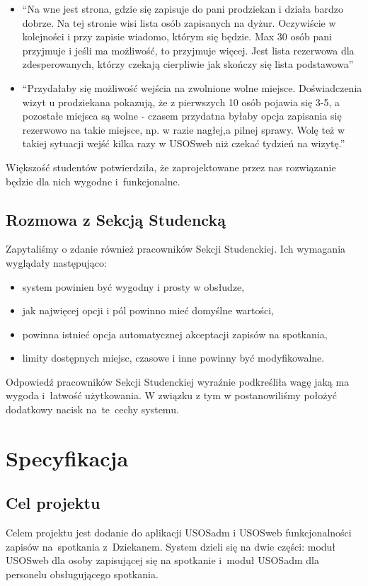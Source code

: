 \documentclass[licencjacka]{pracamgr}
\begin{document}
\begin{itemize}
\begin{itemize}
\item \enquote{Na wne jest strona, gdzie się zapisuje do pani prodziekan i działa bardzo dobrze. Na tej stronie wisi lista osób zapisanych na dyżur. Oczywiście w kolejności i przy zapisie wiadomo, którym się będzie. Max 30 osób pani przyjmuje i jeśli ma możliwość, to przyjmuje więcej. Jest lista rezerwowa dla zdesperowanych, którzy czekają cierpliwie jak skończy się lista podstawowa}
\item \enquote{Przydałaby się możliwość wejścia na zwolnione wolne miejsce. Doświadczenia wizyt u prodziekana pokazują, że z pierwszych 10 osób pojawia się 3-5, a pozostałe miejsca są wolne - czasem przydatna byłaby opcja zapisania się rezerwowo na takie miejsce, np. w razie nagłej,a pilnej sprawy.  Wolę też w takiej sytuacji wejść kilka razy w USOSweb niż czekać tydzień na wizytę.}
\end{itemize}

\end{itemize}
Większość studentów potwierdziła, że zaprojektowane przez nas rozwiązanie będzie dla nich wygodne i~funkcjonalne.
 
\section{Rozmowa z Sekcją Studencką}
Zapytaliśmy o zdanie również pracowników Sekcji Studenckiej. Ich wymagania wyglądały następująco:
\begin{itemize}
\setlength\itemsep{0,05em}
    \item system powinien być wygodny i prosty w obsłudze,
    \item jak najwięcej opcji i pól powinno mieć domyślne wartości,
    \item powinna istnieć opcja automatycznej akceptacji zapisów na spotkania,
    \item limity dostępnych miejsc, czasowe i inne powinny być modyfikowalne.
\end{itemize}
Odpowiedź pracowników Sekcji Studenckiej wyraźnie podkreśliła wagę jaką ma wygoda i~łatwość użytkowania. W związku z tym w postanowiliśmy położyć dodatkowy nacisk na~te~cechy systemu.


\chapter{Specyfikacja} \label{chap:specyfikacja}

\section{Cel projektu}
Celem projektu jest dodanie do aplikacji USOSadm i USOSweb funkcjonalności zapisów na~spotkania z~Dziekanem. System dzieli się na dwie części: moduł USOSweb dla osoby zapisującej się na spotkanie i~moduł USOSadm dla personelu obsługującego spotkania.
\end{document}
